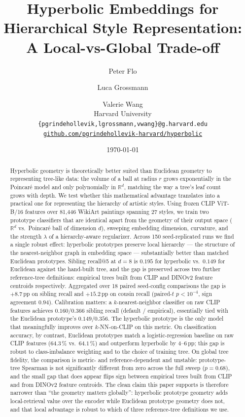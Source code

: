 \documentclass[11pt]{article}
\title{\textbf{Hyperbolic Embeddings for Hierarchical Style
  Representation:\\ A Local-vs-Global Trade-off}}
\author{%
  Peter Flo \and Luca Grossmann \and Valerie Wang \\
  Harvard University\\
  \texttt{\{pgrindehollevik,lgrossmann,vwang\}@g.harvard.edu}\\[0.6em]
  \href{https://github.com/pgrindehollevik-harvard/hyperbolic}{%
    \nolinkurl{github.com/pgrindehollevik-harvard/hyperbolic}}
}
\date{\today}
\begin{document}
\maketitle

\begin{abstract}
Hyperbolic geometry is theoretically better suited than Euclidean
geometry to representing tree-like data: the volume of a ball at
radius $r$ grows exponentially in the Poincar\'e model and only
polynomially in $\mathbb{R}^d$, matching the way a tree's leaf count
grows with depth. We test whether this mathematical advantage
translates into a practical one for representing the hierarchy of
artistic styles. Using frozen CLIP ViT-B/16 features over 81{,}446
WikiArt paintings spanning 27 styles, we train two prototype
classifiers that are identical apart from the geometry of their
output space ($\mathbb{R}^d$ vs.\ Poincar\'e ball of dimension $d$),
sweeping embedding dimension, curvature, and the strength $\lambda$
of a hierarchy-aware regularizer. Across 150 seed-replicated runs we
find a single robust effect: hyperbolic prototypes preserve local
hierarchy --- the structure of the nearest-neighbor graph in
embedding space --- substantially better than matched Euclidean
prototypes. Sibling recall@5 at $d{=}8$ is $0.195$ for hyperbolic
vs.\ $0.149$ for Euclidean against the hand-built tree, and the gap
is preserved across two further reference-tree definitions:
empirical trees built from CLIP and DINOv2 feature centroids
respectively. Aggregated over 18 paired seed-config
comparisons the gap is $+8.7$\,pp on sibling recall and $+15.2$\,pp
on cousin recall (paired-$t$ $p<10^{-4}$, sign agreement $0.94$).
Calibration matters: a $k$-nearest-neighbor classifier on raw CLIP
features achieves $0.160 / 0.366$ sibling recall (default /
empirical), essentially tied with the Euclidean prototype's
$0.149 / 0.356$. The hyperbolic prototype is the only model that
meaningfully improves over $k$-NN-on-CLIP on this metric. On
classification accuracy, by contrast, Euclidean prototypes match a
logistic-regression baseline on raw CLIP features ($64.3$\,\% vs.\
$64.1$\,\%) and outperform hyperbolic by $4$--$6$\,pp; this gap is
robust to class-imbalance weighting and to the choice of training
tree. On global tree fidelity, the comparison is metric- and
reference-dependent and unstable: prototype-tree Spearman is not
significantly different from zero across the full sweep ($p=0.68$),
and the small gap that does appear flips sign between empirical
trees built from CLIP and from DINOv2 feature centroids. The clean
claim this paper supports is therefore narrower than ``the geometry
matters globally'': hyperbolic prototype geometry adds
local-retrieval value over the encoder while Euclidean prototype
geometry does not, and that local advantage is robust to which of
three reference-tree definitions we use.
\end{abstract}
\end{document}
